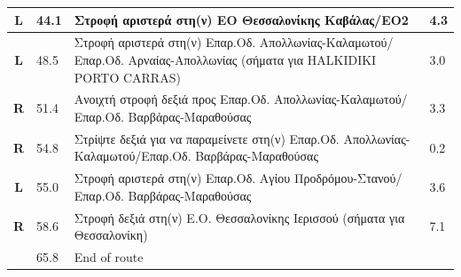 \documentclass[11pt]{article}
\begin{document}
\begin{center}
\begin{supertabular}{|c|p{0.30in}|p{2.25in}|l|}
 \textbf{L} &  44.1 & Στροφή αριστερά στη(ν) ΕΟ Θεσσαλονίκης Καβάλας/\hspace{0pt}ΕΟ2 &   4.3 \\ \hline
 \textbf{L} &  48.5 & Στροφή αριστερά στη(ν) Επαρ.Οδ. Απολλωνίας-Καλαμωτού/\hspace{0pt}Επαρ.Οδ. Αρναίας-Απολλωνίας (σήματα για HALKIDIKI PORTO CARRAS) &   3.0 \\ \hline
{} \textbf{R} &  51.4 & Ανοιχτή στροφή δεξιά προς Επαρ.Οδ. Απολλωνίας-Καλαμωτού/\hspace{0pt}Επαρ.Οδ. Βαρβάρας-Μαραθούσας &   3.3 \\ \hline
{} \textbf{R} &  54.8 & Στρίψτε δεξιά για να παραμείνετε στη(ν) Επαρ.Οδ. Απολλωνίας-Καλαμωτού/\hspace{0pt}Επαρ.Οδ. Βαρβάρας-Μαραθούσας &   0.2 \\ \hline
 \textbf{L} &  55.0 & Στροφή αριστερά στη(ν) Επαρ.Οδ. Αγίου Προδρόμου-Στανού/\hspace{0pt}Επαρ.Οδ. Βαρβάρας-Μαραθούσας &   3.6 \\ \hline
{} \textbf{R} &  58.6 & Στροφή δεξιά στη(ν) Ε.Ο. Θεσσαλονίκης Ιερισσού (σήματα για Θεσσαλονίκη) &   7.1 \\ \hline
{} \textbf{} &  65.8 & End of route &  \\ \hline

\end{supertabular}
\end{center}
\end{document}
